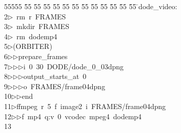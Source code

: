 %
%
\begin{tabbing}
55555 \= 55 \= 55 \= 55 \= 55 \= 55 \= 55 \= 55 \= 55 \= 55 \= 55 \= 55 \= 55 \= \>dode\_video:\\[0pt]
2\>$\triangleright$\>\ rm\ r\ FRAMES\\[0pt]
3\>$\triangleright$\>\ mkdir\ FRAMES\\[0pt]
4\>$\triangleright$\>\ rm\ dodemp4\\[0pt]
5\>$\triangleright$\>(ORBITER)\ \\[0pt]
6\>$\triangleright$\>$\triangleright$\>prepare\_frames\ \\[0pt]
7\>$\triangleright$\>$\triangleright$\>$\triangleright$\>i\ 0\ 30\ DODE/dode\_0\_03dpng\ \\[0pt]
8\>$\triangleright$\>$\triangleright$\>$\triangleright$\>output\_starts\_at\ 0\ \\[0pt]
9\>$\triangleright$\>$\triangleright$\>$\triangleright$\>o\ FRAMES/frame04dpng\ \\[0pt]
10\>$\triangleright$\>$\triangleright$\>end\\[0pt]
11\>$\triangleright$\>ffmpeg\ r\ 5\ f\ image2\ i\ FRAMES/frame04dpng\ \\[0pt]
12\>$\triangleright$\>$\triangleright$\>f\ mp4\ q:v\ 0\ vcodec\ mpeg4\ dodemp4\\[0pt]
13\>\end{tabbing}
